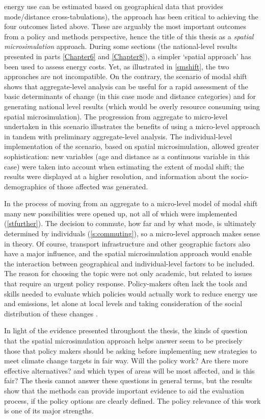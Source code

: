 energy use can be estimated based on geographical data that provides
mode/distance cross-tabulations), the approach has been critical to achieving the four
outcomes listed above. These are arguably the most important outcomes
from a policy and methods perspective, hence the title of this thesis as a
\emph{spatial microsimulation} approach. During some sections (the
national-level results presented in parts \cref{Chapter6} and \cref{Chapter8}),
a simpler `spatial approach' has been used to assess energy costs.
Yet, as illustrated in \cref{smshift}, the two approaches are not incompatible.
On the contrary, the scenario of modal shift shows that aggregate-level
analysis can be useful for a rapid assessment of the basic determinants of
change (in this case mode and distance categories) and for generating
national level results (which would be overly resource consuming
using spatial microsimulation). The progression from aggregate to micro-level
undertaken in this scenario illustrates the benefits of using a micro-level
approach in tandem with preliminary aggregate-level analysis.
The individual-level implementation of the scenario, based on spatial microsimulation,
allowed greater sophistication: new variables
(age and distance as a continuous variable in this case)
were taken into account when estimating the extent of modal shift;
the results were displayed at a higher resolution,
and information about the socio-demographics of those affected was generated.

In the process of moving from an aggregate to a micro-level model of
modal shift many new possibilities were opened up, not
all of which were implemented (\cref{stfurther}). The decision to commute,
how far and by what mode, is ultimately determined
by individuals (\cref{s:commuting}), so a micro-level approach makes sense in theory.
Of course, transport infrastructure and other geographic factors also have a major
influence, and the spatial microsimulation approach would enable the interaction
between geographical and individual-level factors to be included.
The reason for choosing the topic
were not only academic, but related to issues that
require an urgent policy response. Policy-makers often lack the tools and skills needed to
evaluate which policies would actually work to reduce energy
use and emissions, let alone at local levels and taking consideration
of the social distribution of these changes \citep{Banister2008, Tribby2012}.

In light of the evidence presented throughout the thesis, the kinds of question that
the spatial microsimulation approach helps answer
seem to be precisely those that policy makers should be asking before implementing new
strategies to meet climate change targets in fair way. Will the policy work?
Are there more effective alternatives? and which types of areas will be most
affected, and is this fair? The thesis cannot answer these questions in general terms,
but the results show that the 
methods can provide important evidence to aid the evaluation process, if the policy options are
clearly defined. The policy relevance of this work is one of its major strengths.

